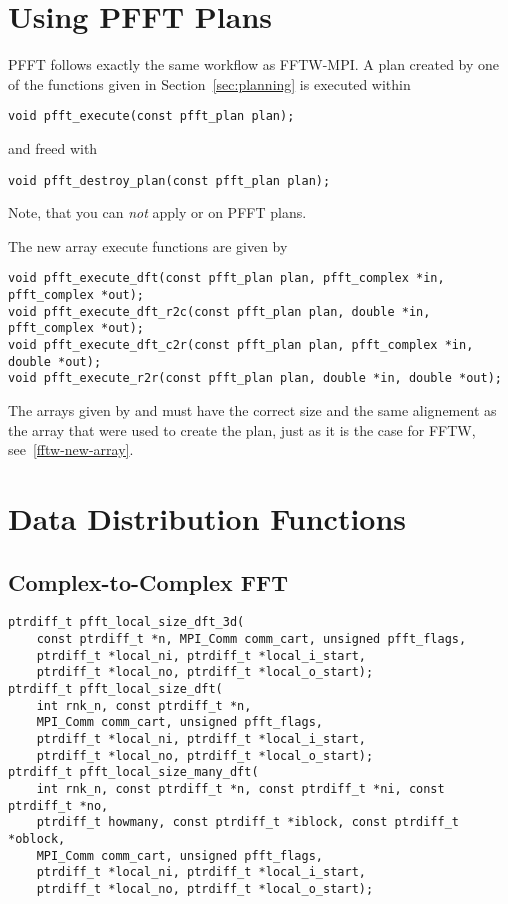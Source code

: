 \section{Using PFFT Plans}
PFFT follows exactly the same workflow as FFTW-MPI. 
A plan created by one of the functions given in Section~\ref{sec:planning} is executed within
\begin{lstlisting}
void pfft_execute(const pfft_plan plan);
\end{lstlisting}
and freed with
\begin{lstlisting}
void pfft_destroy_plan(const pfft_plan plan);
\end{lstlisting}
Note, that you can \emph{not} apply  or  on PFFT plans. 

The new array execute functions are given by
\begin{lstlisting}
void pfft_execute_dft(const pfft_plan plan, pfft_complex *in, pfft_complex *out);
void pfft_execute_dft_r2c(const pfft_plan plan, double *in, pfft_complex *out);
void pfft_execute_dft_c2r(const pfft_plan plan, pfft_complex *in, double *out);
void pfft_execute_r2r(const pfft_plan plan, double *in, double *out);
\end{lstlisting}
The arrays given by  and  must have the correct size
and the same alignement as the array that were used to create the plan, just as it is the case for FFTW, see~\ref{fftw-new-array}.



\section{Data Distribution Functions}\label{sec:local-size}

\subsection{Complex-to-Complex FFT}
\begin{lstlisting}
ptrdiff_t pfft_local_size_dft_3d(
    const ptrdiff_t *n, MPI_Comm comm_cart, unsigned pfft_flags,
    ptrdiff_t *local_ni, ptrdiff_t *local_i_start,
    ptrdiff_t *local_no, ptrdiff_t *local_o_start);
ptrdiff_t pfft_local_size_dft(
    int rnk_n, const ptrdiff_t *n,
    MPI_Comm comm_cart, unsigned pfft_flags,
    ptrdiff_t *local_ni, ptrdiff_t *local_i_start,
    ptrdiff_t *local_no, ptrdiff_t *local_o_start);
ptrdiff_t pfft_local_size_many_dft(
    int rnk_n, const ptrdiff_t *n, const ptrdiff_t *ni, const ptrdiff_t *no,
    ptrdiff_t howmany, const ptrdiff_t *iblock, const ptrdiff_t *oblock,
    MPI_Comm comm_cart, unsigned pfft_flags,
    ptrdiff_t *local_ni, ptrdiff_t *local_i_start,
    ptrdiff_t *local_no, ptrdiff_t *local_o_start);
\end{lstlisting}

